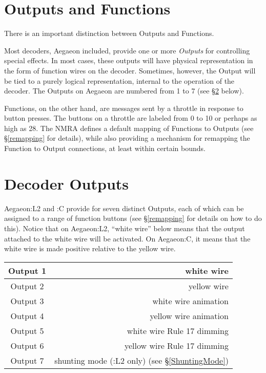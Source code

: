 \documentclass[12pt,letterpaper,draft]{memoir} %
\begin{document}
\section{Outputs and Functions}

There is an important distinction between Outputs and Functions.

Most decoders, Aegaeon included, provide one or more \textit{Outputs} for controlling special effects. In most cases, these outputs will have physical representation in the form of function wires on the decoder. Sometimes, however, the Output will be tied to a purely logical representation, internal to the operation of the decoder. The Outputs on Aegaeon are numbered from 1 to 7 (see \S\ref{outputs} below).

Functions, on the other hand, are messages sent by a throttle in response to button presses. The buttons on a throttle are labeled from 0 to 10 or perhaps as high as 28. The NMRA defines a default mapping of Functions to Outputs (see \S\ref{remapping} for details), while also providing a mechanism for remapping the Function to Output connections, at least within certain bounds.

\section{Decoder Outputs}
\label{outputs}

Aegaeon:L2 and :C provide for seven distinct Outputs, each of which can be assigned to a range of function buttons (see \S\ref{remapping} for details on how to do this). Notice that on Aegaeon:L2, ``white wire'' below means that the output attached to the white wire will be activated. On Aegaeon:C, it means that the white wire is made positive relative to the yellow wire.

\begin{center}
\begin{tabular}{|c|r|}
\hline
Output 1 & white wire \\ \hline
Output 2 & yellow wire \\ \hline
Output 3 & white wire animation \\ \hline
Output 4 & yellow wire animation \\ \hline
Output 5 & white wire Rule 17 dimming \\ \hline
Output 6 & yellow wire Rule 17 dimming \\ \hline
Output 7 & shunting mode (:L2 only) (see \S\ref{ShuntingMode})\\ \hline
\end{tabular}
\end{center}
\end{document}
